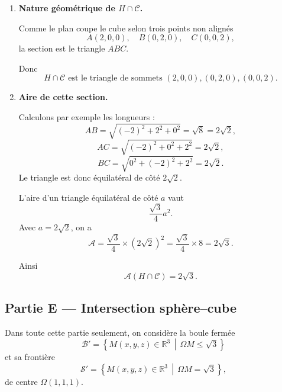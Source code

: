 \documentclass[11pt,a4paper]{article}
\newcommand{\R}{\mathbb{R}}
\newcommand{\Boule}{\mathcal{B}}
\newcommand{\Sphere}{\mathcal{S}}
\newcommand{\Cube}{\mathcal{C}}
\begin{document}
\begin{enumerate}[label=\textbf{\arabic*.},resume]
    \item \textbf{Nature géométrique de \(H\cap \Cube\).}

    Comme le plan coupe le cube selon trois points non alignés
    \[
    A(2,0,0),\quad B(0,2,0),\quad C(0,0,2),
    \]
    la section est le triangle \(ABC\).

    Donc
    \[
    \boxed{H\cap \Cube \text{ est le triangle de sommets }(2,0,0),(0,2,0),(0,0,2).}
    \]

    \item \textbf{Aire de cette section.}

    Calculons par exemple les longueurs :
    \[
    AB=\sqrt{(-2)^2+2^2+0^2}=\sqrt8=2\sqrt2,
    \]
    \[
    AC=\sqrt{(-2)^2+0^2+2^2}=2\sqrt2,
    \]
    \[
    BC=\sqrt{0^2+(-2)^2+2^2}=2\sqrt2.
    \]
    Le triangle est donc équilatéral de côté \(2\sqrt2\).

    L'aire d'un triangle équilatéral de côté \(a\) vaut
    \[
    \frac{\sqrt3}{4}a^2.
    \]
    Avec \(a=2\sqrt2\), on a
    \[
    \mathcal A=\frac{\sqrt3}{4}\times (2\sqrt2)^2
    =\frac{\sqrt3}{4}\times 8=2\sqrt3.
    \]

    Ainsi
    \[
    \boxed{\mathcal A(H\cap \Cube)=2\sqrt3.}
    \]
\end{enumerate}

\subsection*{Partie E --- Intersection sphère--cube}

Dans toute cette partie seulement, on considère la boule fermée
\[
\Boule'=\left\{M(x,y,z)\in\R^3 \,\middle|\, \Omega M\le \sqrt3\right\}
\]
et sa frontière
\[
\Sphere'=\left\{M(x,y,z)\in\R^3 \,\middle|\, \Omega M=\sqrt3\right\},
\]
de centre \(\Omega(1,1,1)\).
\end{document}
